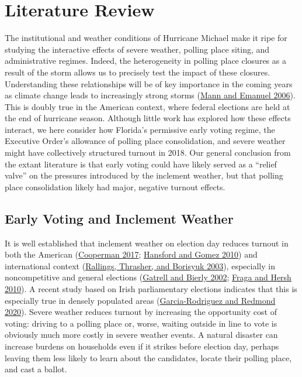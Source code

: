 \documentclass[
  12pt,
]{article}
\begin{document}
\hypertarget{literature-review}{%
\section*{Literature Review}\label{literature-review}}

The institutional and weather conditions of Hurricane Michael make it ripe for studying the interactive effects of severe weather, polling place siting, and administrative regimes. Indeed, the heterogeneity in polling place closures as a result of the storm allows us to precisely test the impact of these closures. Understanding these relationships will be of key importance in the coming years as climate change leads to increasingly strong storms (\protect\hyperlink{ref-Mann2006}{Mann and Emanuel 2006}). This is doubly true in the American context, where federal elections are held at the end of hurricane season. Although little work has explored how these effects interact, we here consider how Florida's permissive early voting regime, the Executive Order's allowance of polling place consolidation, and severe weather might have collectively structured turnout in 2018. Our general conclusion from the extant literature is that early voting could have likely served as a ``relief valve'' on the pressures introduced by the inclement weather, but that polling place consolidation likely had major, negative turnout effects.

\hypertarget{early-voting-and-inclement-weather}{%
\subsection*{Early Voting and Inclement Weather}\label{early-voting-and-inclement-weather}}

It is well established that inclement weather on election day reduces turnout in both the American (\protect\hyperlink{ref-Cooperman2017}{Cooperman 2017}; \protect\hyperlink{ref-Hansford2010}{Hansford and Gomez 2010}) and international context (\protect\hyperlink{ref-Rallings2003}{Rallings, Thrasher, and Borisyuk 2003}), especially in noncompetitive and general elections (\protect\hyperlink{ref-Gatrell2002}{Gatrell and Bierly 2002}; \protect\hyperlink{ref-Fraga2010}{Fraga and Hersh 2010}). A recent study based on Irish parliamentary elections indicates that this is especially true in densely populated areas (\protect\hyperlink{ref-Garcia-Rodriguez2020}{Garcia-Rodriguez and Redmond 2020}). Severe weather reduces turnout by increasing the opportunity cost of voting: driving to a polling place or, worse, waiting outside in line to vote is obviously much more costly in severe weather events. A natural disaster can increase burdens on households even if it strikes before election day, perhaps leaving them less likely to learn about the candidates, locate their polling place, and cast a ballot.
\end{document}
